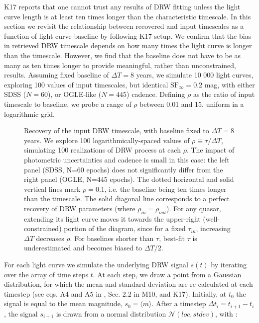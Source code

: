 \documentclass[twocolumn]{aastex62}
\begin{document}
K17 reports that one cannot trust any results of DRW fitting unless the light curve length is at least ten times longer than the characteristic timescale. In this section we revisit the relationship between recovered and input timescales as a function of light curve baseline by following K17 setup. We confirm that the bias in retrieved DRW timescale depends on how many times the light curve is longer than the timescale. However, we find that the baseline does not have to be as many as ten times longer to provide meaningful, rather than unconstrained, results. Assuming fixed baseline of $\Delta T = 8$ years, we simulate 10 000 light curves, exploring 100 values of input timescales, but identical $\mathrm{SF}_{\infty}=0.2$ mag, with either SDSS ($N=60$), or OGLE-like ($N=445$) cadence. Defining $\rho$ as the ratio of input timescale to baseline, we probe a range of $\rho$ between 0.01 and 15, uniform in a logarithmic grid.

\begin{figure*}
	\caption{Recovery of the input DRW timescale, with baseline fixed to $\Delta T = 8$ years. We explore 100 logarithmically-spaced values of $\rho \equiv \tau / \Delta T$, simulating 100 realizations of DRW process at each $\rho$. The impact of photometric uncertainties and cadence is small in this case: the left panel (SDSS, N=60 epochs) does not significantly differ from the right panel (OGLE, N=445 epochs). The dotted horizontal and solid vertical lines mark $\rho = 0.1$, i.e. the baseline being ten times longer than the timescale. The solid diagonal line corresponds to a perfect recovery of DRW parameters (where $\rho_{in} =\rho_{out} $). For any quasar, extending its light curve  moves it towards the upper-right (well-constrained) portion of the diagram, since for a fixed $\tau_{in}$, increasing $\Delta T$ decreases $\rho$. For baselines shorter than $\tau$, best-fit $\tau$ is underestimated and becomes biased to $\Delta T /2 $. } 
	\label{fig:rho_space}
\end{figure*}


For each light curve we simulate the underlying DRW signal $s(t)$ by iterating over the array of time steps $t$.  At each step, we draw a point from a Gaussian distribution, for which the mean and standard deviation are re-calculated at each timestep (see eqs. A4 and A5 in \citealt{kelly2009}, Sec. 2.2 in M10, and K17). Initially, at $t_{0}$ the signal is equal to the mean magnitude, $s_{0} = \langle m \rangle$. After a timestep $\Delta t_{i} = t_{i+1} - t_{i}$, the signal $s_{i+1}$ is drawn from  a normal distribution $\mathcal{N}(loc, stdev)$, with : 
\end{document}
